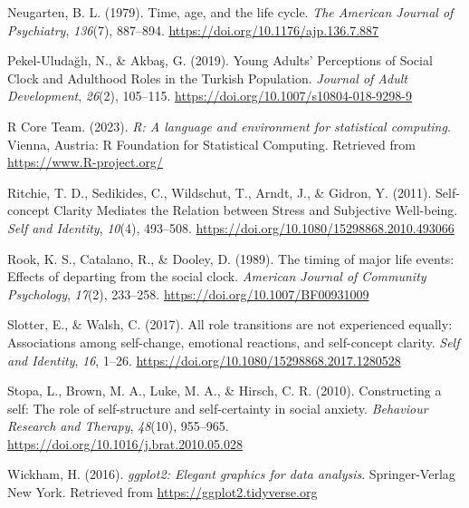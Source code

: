 \documentclass[
  man,floatsintext]{apa6}
\newlength{\cslhangindent}
\newlength{\cslentryspacingunit} %
\newenvironment{CSLReferences}[2] %
 {%
  \setlength{\parindent}{0pt}
  \ifodd #1
  \let\oldpar\par
  \def\par{\hangindent=\cslhangindent\oldpar}
  \fi
  \setlength{\parskip}{#2\cslentryspacingunit}
 }%
 {}
\begin{document}
\begin{CSLReferences}{1}{0}
\leavevmode{}%
Neugarten, B. L. (1979). Time, age, and the life cycle. \emph{The American Journal of Psychiatry}, \emph{136}(7), 887--894. \url{https://doi.org/10.1176/ajp.136.7.887}

\leavevmode{}%
Pekel-Uludağlı, N., \& Akbaş, G. (2019). Young {Adults}' {Perceptions} of {Social Clock} and {Adulthood Roles} in the {Turkish Population}. \emph{Journal of Adult Development}, \emph{26}(2), 105--115. \url{https://doi.org/10.1007/s10804-018-9298-9}

\leavevmode{}%
R Core Team. (2023). \emph{R: A language and environment for statistical computing}. Vienna, Austria: R Foundation for Statistical Computing. Retrieved from \url{https://www.R-project.org/}

\leavevmode{}%
Ritchie, T. D., Sedikides, C., Wildschut, T., Arndt, J., \& Gidron, Y. (2011). Self-concept {Clarity Mediates} the {Relation} between {Stress} and {Subjective Well-being}. \emph{Self and Identity}, \emph{10}(4), 493--508. \url{https://doi.org/10.1080/15298868.2010.493066}

\leavevmode{}%
Rook, K. S., Catalano, R., \& Dooley, D. (1989). The timing of major life events: {Effects} of departing from the social clock. \emph{American Journal of Community Psychology}, \emph{17}(2), 233--258. \url{https://doi.org/10.1007/BF00931009}

\leavevmode{}%
Slotter, E., \& Walsh, C. (2017). All role transitions are not experienced equally: {Associations} among self-change, emotional reactions, and self-concept clarity. \emph{Self and Identity}, \emph{16}, 1--26. \url{https://doi.org/10.1080/15298868.2017.1280528}

\leavevmode{}%
Stopa, L., Brown, M. A., Luke, M. A., \& Hirsch, C. R. (2010). Constructing a self: {The} role of self-structure and self-certainty in social anxiety. \emph{Behaviour Research and Therapy}, \emph{48}(10), 955--965. \url{https://doi.org/10.1016/j.brat.2010.05.028}

\leavevmode{}%
Wickham, H. (2016). \emph{ggplot2: Elegant graphics for data analysis}. Springer-Verlag New York. Retrieved from \url{https://ggplot2.tidyverse.org}


\end{CSLReferences}
\end{document}
